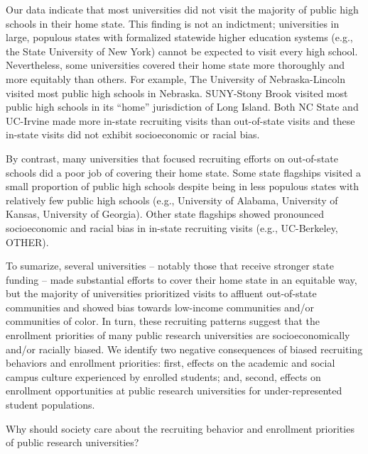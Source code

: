 \documentclass[twoside]{article}
\begin{document}
Our data indicate that most universities did not visit the majority of public high schools in their home state. This finding is not an indictment; universities in large, populous states with formalized statewide higher education systems (e.g., the State University of New York) cannot be expected to visit every high school. Nevertheless, some universities covered their home state more thoroughly and more equitably than others.  For example, The University of Nebraska-Lincoln visited most public high schools in Nebraska. SUNY-Stony Brook visited most public high schools in its ``home'' jurisdiction of Long Island. Both NC State and UC-Irvine made more in-state recruiting visits than out-of-state visits and these in-state visits did not exhibit socioeconomic or racial bias.  

By contrast, many universities that focused recruiting efforts on out-of-state schools did a poor job of covering their home state. Some state flagships visited a small proportion of public high schools despite being in less populous states with relatively few public high schools (e.g., University of Alabama, University of Kansas, University of Georgia).  Other state flagships showed pronounced socioeconomic and racial bias in in-state recruiting visits (e.g., UC-Berkeley, OTHER).


To sumarize, several universities -- notably those that receive stronger state funding -- made substantial efforts to cover their home state in an equitable way, but the majority of universities prioritized visits to affluent out-of-state communities and showed bias towards low-income communities and/or communities of color.  In turn, these recruiting patterns suggest that the enrollment priorities of many public research universities are socioeconomically and/or racially biased.  We identify two negative consequences of biased recruiting behaviors and enrollment priorities: first, effects on the academic and social campus culture experienced by enrolled students; and, second, effects on enrollment opportunities at public research universities for under-represented student populations.

 Why should society care about the recruiting behavior and enrollment priorities of public research universities? 
 
\end{document}
